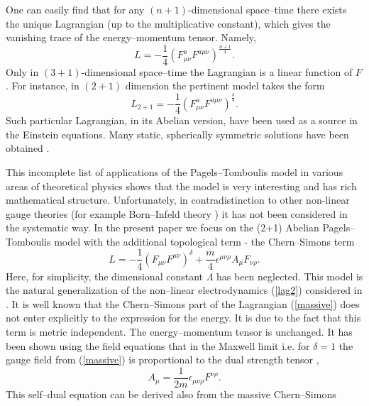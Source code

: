 \documentclass[a4 paper, 12 pt] {article}
\begin{document}
One can easily find that for any $(n+1)$-dimensional space--time
there exists the unique Lagrangian (up to the
 multiplicative constant),
which gives the vanishing trace of the energy--momentum tensor.
Namely,
\begin{equation}
L= -\frac{1}{4}(F^a_{\mu \nu } F^{a \mu \nu })^{\frac{n+1}{4}}.
\label{tracelag}
\end{equation}
Only in $(3+1)$-dimensional space--time the Lagrangian is a linear
function of $F$. For instance, in $(2+1)$ dimension the pertinent
model takes the form
\begin{equation}
L_{2+1}=-\frac{1}{4} (F^a_{\mu \nu } F^{a \mu \nu
})^{\frac{3}{4}}. \label{lag2}
\end{equation}
Such particular Lagrangian, in its Abelian version, have been used
as a source in the Einstein equations. Many static, spherically
symmetric solutions have been obtained \cite{Garcia}.
\par
This incomplete list of applications of the Pagels--Tomboulis model
in various areas of theoretical physics shows that the model is
very interesting and has rich mathematical structure.
Unfortunately, in contradistinction to other non-linear gauge theories
(for example Born--Infeld theory \cite{born}) it has not been
considered in the systematic way.
\newline
In the present paper we focus on the (2+1) Abelian
Pagels--Tomboulis model with the additional topological term -
the Chern--Simons term
\begin{equation}
L= -\frac{1}{4} (F_{\mu \nu }F^{\mu \nu } )^{\delta} +\frac{m}{4}
\epsilon^{\mu \nu \rho } A_{\mu } F_{\nu \rho }.
\label{massive}
\end{equation}
Here, for simplicity, the dimensional constant $\Lambda $ has been
neglected. This model is the natural generalization of the
non--linear electrodynamics (\ref{lag2}) considered in
\cite{Garcia}. It is well known that the Chern--Simons part of the
Lagrangian (\ref{massive}) does not enter explicitly to the
expression for the energy. It is due to the fact that this term is
metric independent. The energy--momentum tensor is unchanged. It
has been shown using the field equations that in the Maxwell limit i.e.
for $\delta =1$ the gauge field from (\ref{massive}) is
proportional to the dual strength tensor \cite{Jackiw},
\cite{Deser}
\begin{equation}
A_{\mu }=\frac{1}{2m} \epsilon_{\mu \nu \rho} F^{\nu \rho}.
\label{maxdual}
\end{equation}
This self--dual equation can be derived also from the massive Chern--Simons
\end{document}
